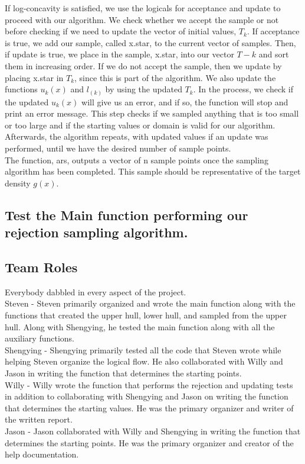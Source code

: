 \documentclass[12pt]{article}
\begin{document}
If log-concavity is satisfied, we use the logicals for acceptance and update to proceed with our algorithm.  We check whether we accept the sample or not before checking if we need to update the vector of initial values, $T_k$.  If acceptance is true, we add our sample, called x.star, to the current vector of samples. Then, if update is true, we place in the sample, x.star, into our vector $T-k$ and sort them in increasing order. If we do not accept the sample, then we update by placing x.star in $T_k$, since this is part of the algorithm.  We also update the functions $u_k(x)$ and $l_(k)$ by using the updated $T_k$.  In the process, we check if the updated $u_k(x)$ will give us an error, and if so, the function will stop and print an error message.  This step checks if we sampled anything that is too small or too large and if the starting values or domain is valid for our algorithm.  Afterwards, the algorithm repeats, with updated values if an update was performed, until we have the desired number of sample points.\\

The function, ars, outputs a vector of n sample points once the sampling algorithm has been completed.  This sample should be representative of the target density $g(x)$.  


\subsection*{Test the Main function performing our rejection sampling algorithm.}

\subsection*{Team Roles}
Everybody dabbled in every aspect of the project.  \\

Steven - Steven primarily organized and wrote the main function along with the functions that created the upper hull, lower hull, and sampled from the upper hull.  Along with Shengying, he tested the main function along with all the auxiliary functions.  \\

Shengying - Shengying primarily tested all the code that Steven wrote while helping Steven organize the logical flow.  He also collaborated with Willy and Jason in writing the function that determines the starting points.\\

Willy - Willy wrote the function that performs the rejection and updating tests in addition to collaborating with Shengying and Jason on writing the function that determines the starting values.  He was the primary organizer and writer of the written report.\\

Jason - Jason collaborated with Willy and Shengying in writing the function that determines the starting points.  He was the primary organizer and creator of the help documentation.
\end{document}
